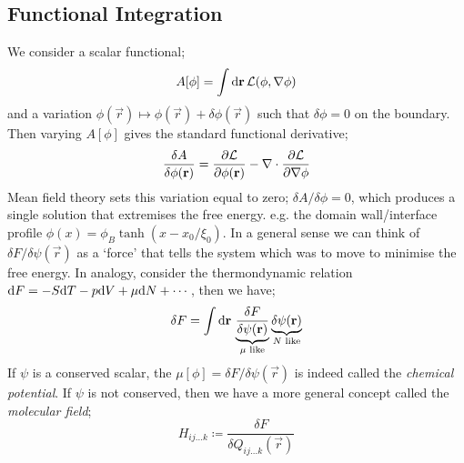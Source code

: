 \subsection{Functional Integration}
We consider a scalar functional;
\begin{equation}
A[\phi] = \int{\text{d}\mathbf r \, \mathcal{L}(\phi, \nabla\phi)}
\end{equation}
and a variation $\phi(\vec r)\mapsto \phi(\vec r) + \delta \phi(\vec r)$ such that $\delta\phi = 0$ on the boundary. Then varying $A[\phi]$ gives the standard functional derivative;
\begin{equation}
\frac{\delta A}{\delta \phi(\mathbf r)} = \frac{\partial \mathcal{L}}{\partial \phi(\mathbf r)} - \nabla \cdot \frac{\partial \mathcal{L}}{\partial \nabla \phi}
\end{equation}
Mean field theory sets this variation equal to zero; $\delta A/\delta \phi = 0$, which produces a single solution that extremises the free energy. e.g. the domain wall/interface profile $\phi(x) = \phi_B \tanh(x-x_0/\xi_0)$. In a general sense we can think of $\delta F / \delta \psi(\vec r)$ as a `force' that tells the system which was to move to minimise the free energy. In analogy, consider the thermondynamic relation $\text{d} F = -S\text{d} T - p\text{d} V + \mu \text{d} N + \cdots$, then we have;
\begin{equation}
\delta F = \int{\text{d}\mathbf r \, \underbrace{\frac{\delta F}{\delta\psi(\mathbf r)}}_{\mu \text{ like}} \underbrace{\delta \psi(\mathbf r)}_{N \text{ like}}}
\end{equation}
If $\psi$ is a conserved scalar, the $\mu[\phi] = \delta F/\delta\psi(\vec r)$ is indeed called the \emph{chemical potential}. If $\psi$ is not conserved, then we have a more general concept called the \emph{molecular field};\footnotemark
\begin{equation}
H_{ij\ldots k} \coloneqq \frac{\delta F}{\delta Q_{ij \ldots k}(\vec r)}
\end{equation}
